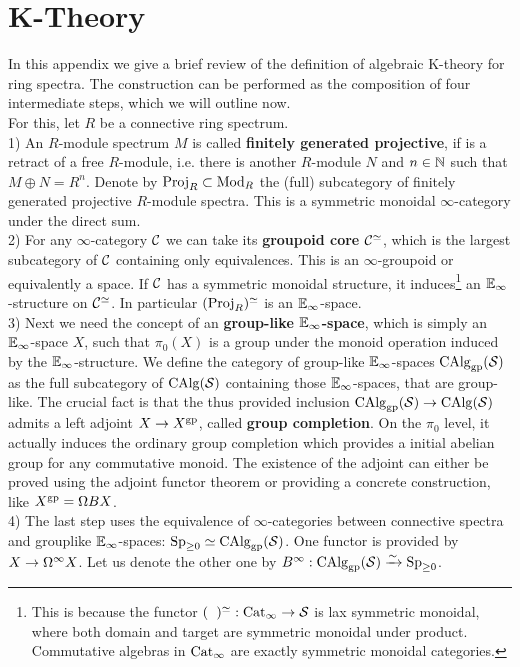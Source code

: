 \appendix
\chapter{K-Theory}
In this appendix we give a brief review of the definition of algebraic K-theory for ring spectra. The construction can be performed as the composition of four intermediate steps, which we will outline now. \\
For this, let $R$ be a connective ring spectrum. \\
1) An $R$-module spectrum $M$ is called \textbf{finitely generated projective}, if is a retract of a free $R$-module, i.e. there is another $R$-module $N$ and  $n\in\mathbb{N}$ such that $M\oplus N=R^n$.
Denote by $\operatorname{Proj}_R\subset \operatorname{Mod}_R$ the (full) subcategory of finitely generated projective $R$-module spectra. This is a symmetric monoidal $\infty$-category under the direct sum. \\
2) For any $\infty$-category $\mathcal{C}$ we can take its \textbf{groupoid core} $\mathcal{C}^{\simeq}$, which is the largest subcategory of $\mathcal{C}$ containing only equivalences. This is an $\infty$-groupoid or equivalently a space. If $\mathcal{C}$ has a symmetric monoidal structure, it induces\footnote{This is because the functor $(\phantom{\cC})^{\simeq}:\Cat_{\infty}\ra \Spc$ is lax symmetric monoidal, where both domain and target are symmetric monoidal under product. Commutative algebras in $\operatorname{Cat}_\infty$ are exactly symmetric monoidal categories.} an $\mathbb{E}_\infty$-structure on $\mathcal{C}^{\simeq}$. In particular $(\operatorname{Proj}_R)^{\simeq}$ is an $\mathbb{E}_\infty$-space.\\
3) Next we need the concept of an \textbf{group-like $\mathbb{E}_\infty$-space}, which is simply an $\mathbb{E}_\infty$-space $X$, such that $\pi_0(X)$ is a group under the monoid operation induced by the $\mathbb{E}_\infty$-structure. We define the category of group-like $\mathbb{E}_\infty$-spaces $\operatorname{CAlg}_{\operatorname{gp}}(\mathcal{S})$ as the full subcategory of $\operatorname{CAlg}(\mathcal{S})$ containing those  $\mathbb{E}_\infty$-spaces, that are group-like. The crucial fact is that the thus provided inclusion $\operatorname{CAlg}_{\operatorname{gp}}(\mathcal{S})\rightarrow \operatorname{CAlg}(\mathcal{S})$ admits a left adjoint $X\to X^{\operatorname{gp}}$, called \textbf{group completion}. On the $\pi_0$ level, it actually induces the ordinary group completion which provides a initial abelian group for any commutative monoid. The existence of the adjoint can either be proved using the adjoint functor theorem or providing a concrete construction, like $X^{\operatorname{gp}}=\Omega BX$. \\
4) The last step uses the equivalence of $\infty$-categories between connective spectra and grouplike $\mathbb{E}_\infty$-spaces: $\operatorname{Sp}_{\geq 0}\simeq \operatorname{CAlg}_{\operatorname{gp}}(\mathcal{S})$. One functor is provided by $X\rightarrow \Omega^{\infty}X$. Let us denote the other one by $B^\infty:\operatorname{CAlg}_{\operatorname{gp}}(\mathcal{S})\xrightarrow{\sim} \operatorname{Sp}_{\geq 0} $.  \\
